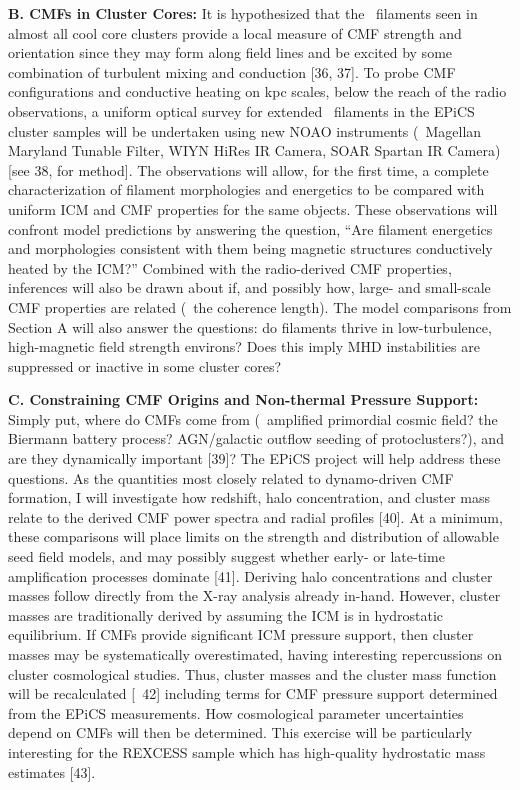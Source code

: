 \documentclass[letterpaper,11pt]{article}
\newcommand{\myhead}{Cavagnolo, Grainger Proposal}
\begin{document}
\markright{\myhead}
{\bf{B. CMFs in Cluster Cores:}} It is hypothesized that the
\halpha\ filaments seen in almost all cool core clusters provide a
local measure of CMF strength and orientation since they may form
along field lines and be excited by some combination of turbulent
mixing and conduction [36, 37]. To probe CMF configurations and
conductive heating on kpc scales, below the reach of the radio
observations, a uniform optical survey for extended \halpha\ filaments
in the EPiCS cluster samples will be undertaken using new NOAO
instruments (\ie\ Magellan Maryland Tunable Filter, WIYN HiRes IR
Camera, SOAR Spartan IR Camera) [see 38, for method]. The observations
will allow, for the first time, a complete characterization of
filament morphologies and energetics to be compared with uniform ICM
and CMF properties for the same objects. These observations will
confront model predictions by answering the question, ``Are filament
energetics and morphologies consistent with them being magnetic
structures conductively heated by the ICM?''  Combined with the
radio-derived CMF properties, inferences will also be drawn about if,
and possibly how, large- and small-scale CMF properties are related
(\eg\ the coherence length). The model comparisons from Section A will
also answer the questions: do filaments thrive in low-turbulence,
high-magnetic field strength environs? Does this imply MHD
instabilities are suppressed or inactive in some cluster cores?

{\bf{C. Constraining CMF Origins and Non-thermal Pressure Support:}}
Simply put, where do CMFs come from (\eg\ amplified primordial cosmic
field?  the Biermann battery process?  AGN/galactic outflow seeding of
protoclusters?), and are they dynamically important [39]? The EPiCS
project will help address these questions. As the quantities most
closely related to dynamo-driven CMF formation, I will investigate how
redshift, halo concentration, and cluster mass relate to the derived
CMF power spectra and radial profiles [40]. At a minimum, these
comparisons will place limits on the strength and distribution of
allowable seed field models, and may possibly suggest whether early-
or late-time amplification processes dominate [41]. Deriving halo
concentrations and cluster masses follow directly from the X-ray
analysis already in-hand. However, cluster masses are traditionally
derived by assuming the ICM is in hydrostatic equilibrium. If CMFs
provide significant ICM pressure support, then cluster masses may be
systematically overestimated, having interesting repercussions on
cluster cosmological studies. Thus, cluster masses and the cluster
mass function will be recalculated [\eg\ 42] including terms for CMF
pressure support determined from the EPiCS measurements. How
cosmological parameter uncertainties depend on CMFs will then be
determined. This exercise will be particularly interesting for the
REXCESS sample which has high-quality hydrostatic mass estimates [43].
\end{document}
